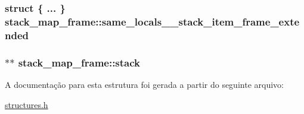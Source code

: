 \subsubsection[{\texorpdfstring{same\+\_\+locals\+\_\+1\+\_\+stack\+\_\+item\+\_\+frame\+\_\+extended}{same_locals_1_stack_item_frame_extended}}]{\setlength{\rightskip}{0pt plus 5cm}struct \{ ... \}   stack\+\_\+map\+\_\+frame\+::same\+\_\+locals\+\_\+\_\+stack\+\_\+item\+\_\+frame\+\_\+extended}\hypertarget{structstack__map__frame_a6260d1ad8fd7b980baac858d66779601}{}\label{structstack__map__frame_a6260d1ad8fd7b980baac858d66779601}
\subsubsection[{\texorpdfstring{stack}{stack}}]{$\ast$$\ast$ stack\+\_\+map\+\_\+frame\+::stack}\hypertarget{structstack__map__frame_acf0d1f6336e72271bc0d91186a9360d5}{}\label{structstack__map__frame_acf0d1f6336e72271bc0d91186a9360d5}


A documentação para esta estrutura foi gerada a partir do seguinte arquivo\+:\begin{DoxyCompactItemize}
\item 
\hyperlink{structures_8h}{structures.\+h}\end{DoxyCompactItemize}
